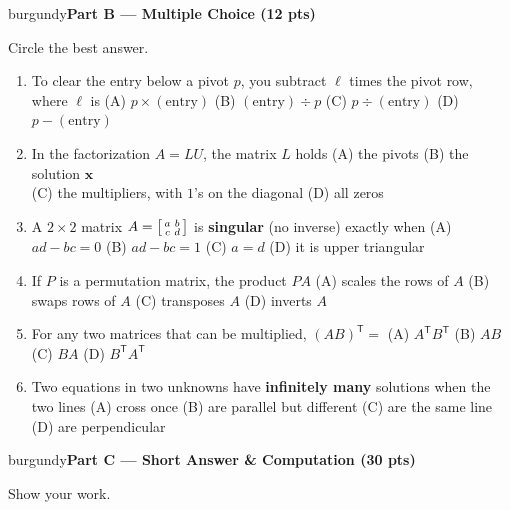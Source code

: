 \documentclass[10pt]{article}
\newcommand{\xx}{\mathbf{x}}
\newcommand{\parthead}[1]{%
  \vspace{6pt}\noindent
  \begin{headlinebox}{burgundy}{\color{white}\bfseries #1}\end{headlinebox}%
  \vspace{4pt}}
\begin{document}
\parthead{Part B --- Multiple Choice (12 pts)}
Circle the best answer.

\begin{enumerate}[leftmargin=1.9em, itemsep=9pt]
  \item To clear the entry below a pivot $p$, you subtract $\ell$ times the pivot row, where $\ell$ is
    \hfill (A) $p\times(\text{entry})$ \quad (B) $(\text{entry})\div p$ \quad
    (C) $p\div(\text{entry})$ \quad (D) $p-(\text{entry})$
  \item In the factorization $A=LU$, the matrix $L$ holds
    \hfill (A) the pivots \quad (B) the solution $\xx$ \\
    \phantom{x}\hfill (C) the multipliers, with $1$'s on the diagonal \quad (D) all zeros
  \item A $2\times2$ matrix $A=\begin{bsmallmatrix}a&b\\c&d\end{bsmallmatrix}$ is \textbf{singular} (no inverse) exactly when
    \hfill (A) $ad-bc=0$ \quad (B) $ad-bc=1$ \quad (C) $a=d$ \quad (D) it is upper triangular
  \item If $P$ is a permutation matrix, the product $PA$
    \hfill (A) scales the rows of $A$ \quad (B) swaps rows of $A$ \quad (C) transposes $A$ \quad (D) inverts $A$
  \item For any two matrices that can be multiplied, $(AB)^{\mathsf T}=$
    \hfill (A) $A^{\mathsf T}B^{\mathsf T}$ \quad (B) $AB$ \quad (C) $BA$ \quad (D) $B^{\mathsf T}A^{\mathsf T}$
  \item Two equations in two unknowns have \textbf{infinitely many} solutions when the two lines
    \hfill (A) cross once \quad (B) are parallel but different \quad (C) are the same line \quad (D) are perpendicular
\end{enumerate}

\parthead{Part C --- Short Answer \& Computation (30 pts)}
Show your work.
\end{document}
